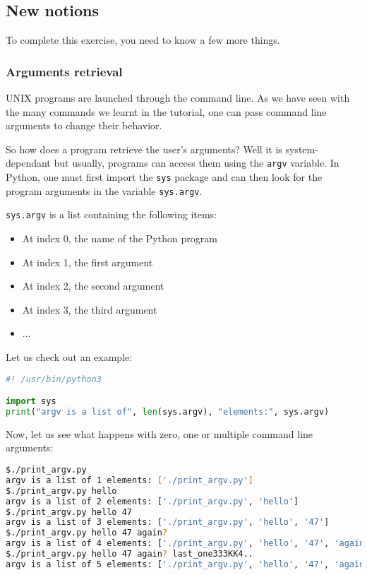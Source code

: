 \documentclass[12pt]{article}
\begin{document}
\subsection{New notions}

To complete this exercise, you need to know a few more things.

\subsubsection{Arguments retrieval}

UNIX programs are launched through the command line. As we have seen with the many commands we learnt in the tutorial, one can pass command line arguments to change their behavior.

So how does a program retrieve the user's arguments? Well it is system-dependant but usually, programs can access them using the \texttt{argv} variable. In Python, one must first import the \texttt{sys} package and can then look for the program arguments in the variable \texttt{sys.argv}.

\texttt{sys.argv} is a list containing the following items:

\begin{itemize}
\item At index 0, the name of the Python program
\item At index 1, the first argument
\item At index 2, the second argument
\item At index 3, the third argument
\item ...
\end{itemize}

Let us check out an example:

\begin{lstlisting}[language=python,style=codestyle,title=print\_argv.py]
#! /usr/bin/python3

import sys
print("argv is a list of", len(sys.argv), "elements:", sys.argv)
\end{lstlisting}

Now, let us see what happens with zero, one or multiple command line arguments:

\begin{lstlisting}[language=bash]
$./print_argv.py 
argv is a list of 1 elements: ['./print_argv.py']
$./print_argv.py hello
argv is a list of 2 elements: ['./print_argv.py', 'hello']
$./print_argv.py hello 47
argv is a list of 3 elements: ['./print_argv.py', 'hello', '47']
$./print_argv.py hello 47 again?
argv is a list of 4 elements: ['./print_argv.py', 'hello', '47', 'again?']
$./print_argv.py hello 47 again? last_one333KK4..
argv is a list of 5 elements: ['./print_argv.py', 'hello', '47', 'again?', 'last_one333KK4..']
\end{lstlisting}
\end{document}
